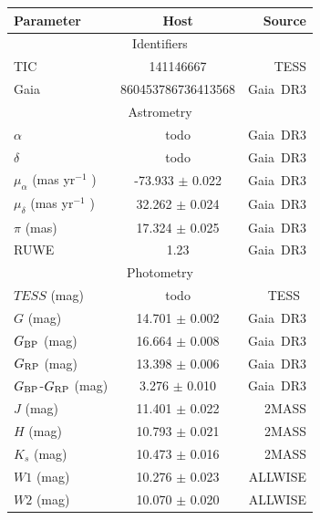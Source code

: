 \documentclass{nature3}
\begin{document}
\begin{methods}
%
\begin{table}
    \centering
    \begin{tabular}{lcr}
    \hline 
    \hline
    Parameter & Host & Source \\
    \hline 
    \multicolumn{3}{c}{Identifiers} \\
    \hline
    TIC & 141146667 & TESS \\
    Gaia & 860453786736413568 & Gaia\ DR3 \\
    \hline
    \multicolumn{3}{c}{Astrometry} \\ 
    \hline
    $\alpha$ & todo & Gaia\ DR3 \\
    $\delta$ & todo & Gaia\ DR3 \\
    $\mu_{\alpha}$ (mas yr$^{-1}$ ) & -73.933 $\pm$ 0.022 & Gaia\ DR3 \\
    $\mu_{\delta}$ (mas yr$^{-1}$ ) &  32.262 $\pm$ 0.024 & Gaia\ DR3 \\
    $\pi$ (mas)                     &  17.324 $\pm$ 0.025 & Gaia\ DR3 \\
    RUWE                            &  1.23               & Gaia\ DR3 \\
    \hline
    \multicolumn{3}{c}{Photometry} \\
    \hline
    $TESS$ (mag) & todo & TESS\ \\
    $G$ (mag)                       & 14.701 $\pm$ 0.002 & Gaia\ DR3 \\
    $G_{\rm BP}$ (mag)              & 16.664 $\pm$ 0.008 & Gaia\ DR3 \\
    $G_{\rm RP}$ (mag)              & 13.398 $\pm$ 0.006 & Gaia\ DR3 \\
    $G_{\rm BP}$-$G_{\rm RP}$ (mag) &  3.276 $\pm$ 0.010 & Gaia\ DR3 \\
    $J$ (mag)                       & 11.401 $\pm$ 0.022 & 2MASS     \\
    $H$ (mag)                       & 10.793 $\pm$ 0.021 & 2MASS     \\
    $K_s$ (mag)                     & 10.473 $\pm$ 0.016 & 2MASS     \\
    $W1$ (mag)                      & 10.276 $\pm$ 0.023 & ALLWISE   \\ %
    $W2$ (mag)                      & 10.070 $\pm$ 0.020 & ALLWISE   \\

\end{tabular}
\end{table}
\end{methods}
\end{document}
